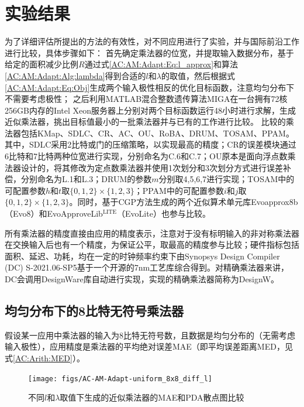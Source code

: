 \section{实验结果} \label{ASIC实验结果}

为了详细评估所提出的方法的有效性，对不同应用进行了实验，并与国际前沿工作进行比较，具体步骤如下：
首先确定乘法器的位宽，并提取输入数据分布，基于给定的面积减少比例$R$通过式\eqref{AC:AM:Adapt:Eq:l_approx}和算法\ref{AC:AM:Adapt:Alg:lambda}得到合适的$l$和$\lambda$的取值，然后根据式\eqref{AC:AM:Adapt:Eq:Obj}生成两个输入极性相反的优化目标函数，注意均匀分布下不需要考虑极性；
之后利用MATLAB混合整数遗传算法MIGA在一台拥有72核256GB内存的Intel Xeon服务器上分别对两个目标函数运行48小时进行求解，生成近似乘法器，挑出目标值最小的一批乘法器并与已有的工作进行比较。
比较的乘法器包括KMap\cite{AC:AM:KMap}、SDLC\cite{AC:AM:SDLC}、CR\cite{AC:AM:CR}、AC\cite{AC:AM:AC}、OU\cite{AC:AM:OU}、RoBA\cite{AC:AM:RoBA}、DRUM\cite{AC:AM:DRUM}、TOSAM\cite{AC:AM:TOSAM}、PPAM\cite{AC:AM:PPAM}。其中，SDLC采用2比特或门的压缩策略，以实现最高的精度；CR的误差模块通过6比特和7比特两种位宽进行实现，分别命名为C.6和C.7；OU原本是面向浮点数乘法器设计的，将其修改为定点数乘法器并使用1次划分和3次划分方式进行误差补偿，分别命名为L.1和L.3；DRUM的参数$m$分别取4,5,6,7进行实现；TOSAM中的可配置参数$h$和$t$取$\{0, 1, 2\} \times \{1, 2, 3\}$；PPAM中的可配置参数$i$和$j$取$\{0, 1, 2\} \times \{1, 2, 3\}$。同时，基于CGP方法生成的两个近似算术单元库Evoapprox8b（Evo8）\cite{AC:AM:CGP_Evoapprox8b}和EvoApproveLib$^\text{LITE}$（EvoLite）\cite{AC:AM:CGP_EvoLite}也参与比较。

所有乘法器的精度直接由应用的精度表示，注意对于没有标明输入的非对称乘法器在交换输入后也有一个精度，为保证公平，取最高的精度参与比较；硬件指标包括面积、延迟、功耗，均在一定的时钟频率约束下由Synopsys Design Compiler (DC) S-2021.06-SP5基于一个开源的7nm工艺库\cite{ASAP7_github}综合得到。对精确乘法器来讲，DC会调用DesignWare库\cite{IP:DesignWare}自动进行实现，实现的精确乘法器简称为DesignW。


\subsection{均匀分布下的8比特无符号乘法器}

假设某一应用中乘法器的输入为8比特无符号数，且数据是均匀分布的（无需考虑输入极性），应用精度是乘法器的平均绝对误差MAE（即平均误差距离MED，见式\ref{AC:Arith:MED}）。

\begin{figure}[!h]
    \centering
    \texttt{[image: figs/AC-AM-Adapt-uniform\_8x8\_diff\_l]}
    \caption{不同$l$和$\lambda$取值下生成的近似乘法器的MAE和PDA散点图比较}
    \label{AC:AM:Adapt:Fig:uniform_8x8_diff_l}
\end{figure}

